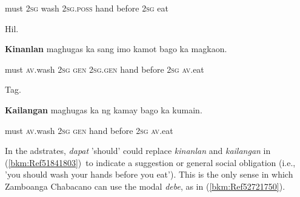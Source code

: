 \begin{stylelsIMT}
must 2\textsc{sg} wash 2\textsc{sg}.\textsc{poss} hand before 2\textsc{sg} eat
\end{stylelsIMT}

\begin{listWWNumiileveli}
\item 
\begin{listWWNumiilevelii}
\item 
\begin{stylelsLanginfo}
Hil.
\end{stylelsLanginfo}
\end{listWWNumiilevelii}
\end{listWWNumiileveli}
\begin{stylelsSourceline}
\textbf{Kinanlan} maghugas ka sang imo kamot bago ka magkaon.
\end{stylelsSourceline}

\begin{stylelsIMT}
must \textsc{av}.wash 2\textsc{sg} \textsc{gen} 2\textsc{sg.gen} hand before 2\textsc{sg} \textsc{av}.eat
\end{stylelsIMT}

\begin{listWWNumiileveli}
\item 
\begin{listWWNumiilevelii}
\item 
\begin{stylelsLanginfo}
Tag.
\end{stylelsLanginfo}
\end{listWWNumiilevelii}
\end{listWWNumiileveli}
\begin{stylelsSourceline}
\textbf{Kailangan} maghugas ka ng kamay bago ka kumain.
\end{stylelsSourceline}

\begin{stylelsIMT}
must \textsc{av}.wash 2\textsc{sg} \textsc{gen} hand before 2\textsc{sg} \textsc{av}.eat
\end{stylelsIMT}

\begin{stylelsLanginfo}
In the adstrates, \textit{dapat} 'should' could replace \textit{kinanlan} and \textit{kailangan} in (\ref{bkm:Ref51841803})\ to indicate a suggestion or general social obligation (i.e., 'you should wash your hands before you eat'). This is the only sense in which Zamboanga Chabacano can use the modal \textit{debe}, as in (\ref{bkm:Ref52721750}).
\end{stylelsLanginfo}


